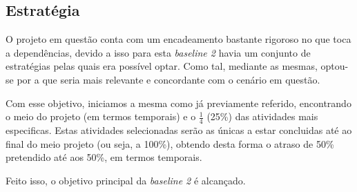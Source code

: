 \subsection{Estratégia}

O projeto em questão conta com um encadeamento bastante rigoroso no que toca a dependências, devido a isso para esta \textit{baseline 2} havia um conjunto de estratégias pelas quais era possível optar. Como tal, mediante as mesmas, optou-se por a que seria mais relevante e concordante com o cenário em questão.

Com esse objetivo, iniciamos a mesma como já previamente referido, encontrando o meio do projeto (em termos temporais) e o $\frac{1}{4}$ (25\%) das atividades mais especificas. Estas atividades selecionadas serão as únicas a estar concluidas até ao final do meio projeto (ou seja, a 100\%), obtendo desta forma o atraso de 50\% pretendido até aos 50\%, em termos temporais.

Feito isso, o objetivo principal da \textit{baseline 2} é alcançado.